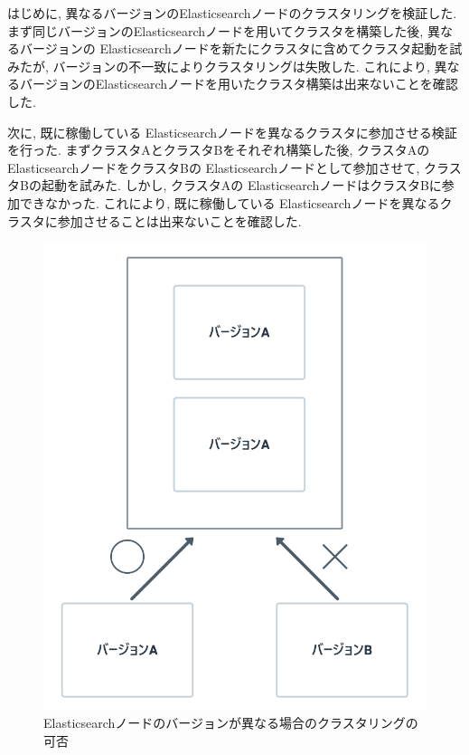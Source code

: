 はじめに, 異なるバージョンのElasticsearchノードのクラスタリングを検証した. まず同じバージョンのElasticsearchノードを用いてクラスタを構築した後, 異なるバージョンの Elasticsearchノードを新たにクラスタに含めてクラスタ起動を試みたが, バージョンの不一致によりクラスタリングは失敗した. これにより, 異なるバージョンのElasticsearchノードを用いたクラスタ構築は出来ないことを確認した.

次に, 既に稼働している Elasticsearchノードを異なるクラスタに参加させる検証を行った. まずクラスタAとクラスタBをそれぞれ構築した後, クラスタAの ElasticsearchノードをクラスタBの Elasticsearchノードとして参加させて, クラスタBの起動を試みた. しかし, クラスタAの ElasticsearchノードはクラスタBに参加できなかった. これにより, 既に稼働している Elasticsearchノードを異なるクラスタに参加させることは出来ないことを確認した.

\begin{figure}[H]
  \begin{center}
    \includegraphics[width=120mm]{sotu/figure/youshi-3.png}
    \caption{Elasticsearchノードのバージョンが異なる場合のクラスタリングの可否}
    \label{4-p16}
  \end{center}
\end{figure}

